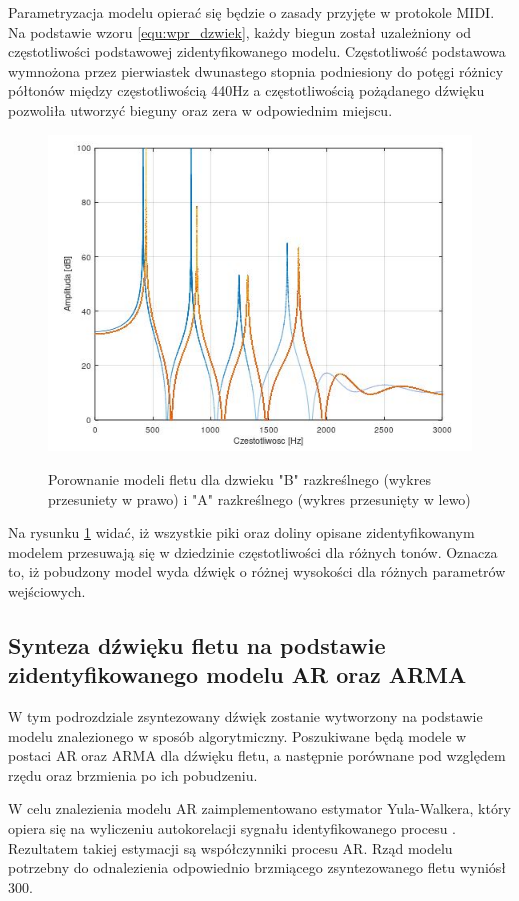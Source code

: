 Parametryzacja modelu opierać się będzie o zasady przyjęte w protokole MIDI. 
Na podstawie wzoru \ref{equ:wpr_dzwiek}, każdy biegun został uzależniony od częstotliwości podstawowej zidentyfikowanego modelu. Częstotliwość podstawowa wymnożona przez pierwiastek dwunastego stopnia podniesiony do potęgi różnicy półtonów między częstotliwością 440Hz a częstotliwością pożądanego dźwięku pozwoliła utworzyć bieguny oraz zera w odpowiednim miejscu.
\begin{figure}[H]
	\centering
	\includegraphics[width=12cm]{grafiki/Model_B_A}
	\label{rys:por_mod_flet}
	\captionsetup{justification=centering}
	\caption{Porownanie modeli fletu dla dzwieku "B" razkreślnego (wykres przesuniety w prawo) i "A" razkreślnego (wykres przesunięty w lewo)}
	\label{rys:por_mod_flet}
\end{figure}
Na rysunku \ref{rys:por_mod_flet} widać, iż wszystkie piki oraz doliny opisane zidentyfikowanym modelem przesuwają się w dziedzinie częstotliwości dla różnych tonów. Oznacza to, iż pobudzony model wyda dźwięk o różnej wysokości dla różnych parametrów wejściowych.


\subsection{Synteza dźwięku fletu na podstawie zidentyfikowanego modelu AR oraz ARMA}
W tym podrozdziale zsyntezowany dźwięk zostanie wytworzony na podstawie modelu znalezionego w sposób algorytmiczny. Poszukiwane będą modele w postaci AR oraz ARMA dla dźwięku fletu, a następnie porównane pod względem rzędu oraz brzmienia po ich pobudzeniu.

W celu znalezienia modelu AR zaimplementowano estymator Yula-Walkera, który opiera się na wyliczeniu autokorelacji sygnału identyfikowanego procesu \cite{Y_W}. Rezultatem takiej estymacji są współczynniki procesu AR. Rząd modelu potrzebny do odnalezienia odpowiednio brzmiącego zsyntezowanego fletu wyniósł 300.

